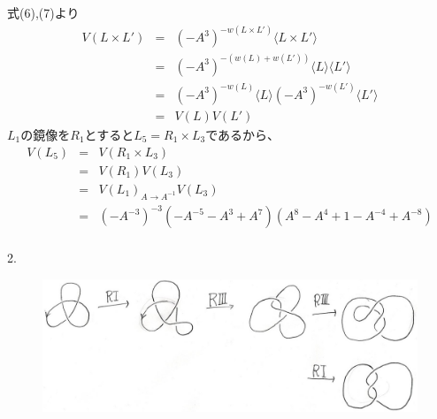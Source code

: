 \documentclass{jsarticle}
\begin{document}
\begin{enumerate}
\begin{enumerate}
式(6),(7)より
\begin{eqnarray}
V(L \times L') &=& (-A^3)^{-w(L \times L')}\langle L \times L' \rangle \nonumber \\
&=& (-A^3)^{-(w(L) + w(L'))}\langle L \rangle \langle L' \rangle \nonumber \\
&=& (-A^3)^{-w(L)}\langle L \rangle (-A^3)^{-w(L')}\langle L' \rangle \nonumber \\
&=& V(L)V(L') \nonumber
\end{eqnarray}
$L_1$の鏡像を$R_1$とすると$L_5 = R_1 \times L_3$であるから、
\begin{eqnarray}
V(L_5) &=& V(R_1 \times L_3) \nonumber \\
&=& V(R_1)V(L_3) \nonumber \\
&=& V(L_1)_{A \to A^{-1}}V(L_3) \nonumber \\
&=& (-A^{-3})^{-3}(-A^{-5} - A^3 + A^7)(A^8 - A^4 + 1 - A^{-4} + A^{-8}) \nonumber \\ \nonumber
\end{eqnarray}
\end{enumerate}

2.\\
\begin{figure}[htbp]
\begin{center}
\includegraphics[clip,width=14cm]{2.jpg}
\end{center}
\end{figure}

\end{enumerate}
\end{document}
